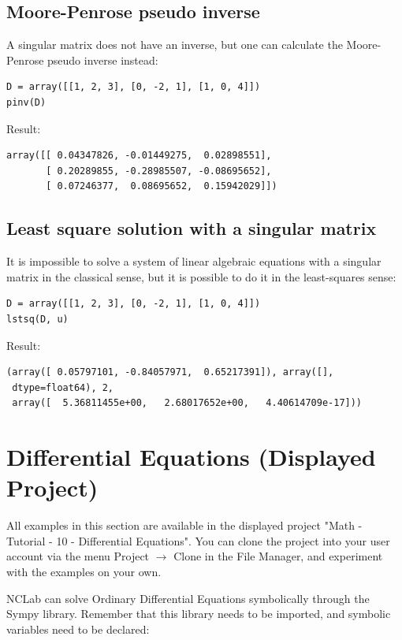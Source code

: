 \documentclass[article,A4,12pt]{llncs}
\begin{document}
\subsection{Moore-Penrose pseudo inverse}

A singular matrix does not have an inverse, but one can calculate the Moore-Penrose
pseudo inverse instead:
\begin{verbatim}
D = array([[1, 2, 3], [0, -2, 1], [1, 0, 4]])
pinv(D)
\end{verbatim}
Result:
\begin{verbatim}
array([[ 0.04347826, -0.01449275,  0.02898551],
       [ 0.20289855, -0.28985507, -0.08695652],
       [ 0.07246377,  0.08695652,  0.15942029]])
\end{verbatim}

\subsection{Least square solution with a singular matrix}

It is impossible to solve a system of linear algebraic equations with a singular
matrix in the classical sense, but it is possible to do it in the least-squares
sense:
\begin{verbatim}
D = array([[1, 2, 3], [0, -2, 1], [1, 0, 4]])
lstsq(D, u)
\end{verbatim}
Result:
\begin{verbatim}
(array([ 0.05797101, -0.84057971,  0.65217391]), array([], 
 dtype=float64), 2, 
 array([  5.36811455e+00,   2.68017652e+00,   4.40614709e-17]))
\end{verbatim}



\section{Differential Equations (Displayed Project)}

All examples in this section are available in the displayed project 
"Math - Tutorial - 10 - Differential Equations". You can clone the project into 
your user account via the menu Project $\rightarrow$ Clone in the File 
Manager, and experiment with the examples on your own.

NCLab can solve Ordinary Differential Equations symbolically through the 
Sympy library. Remember that this library needs to be imported, and 
symbolic variables need to be declared:
\end{document}
